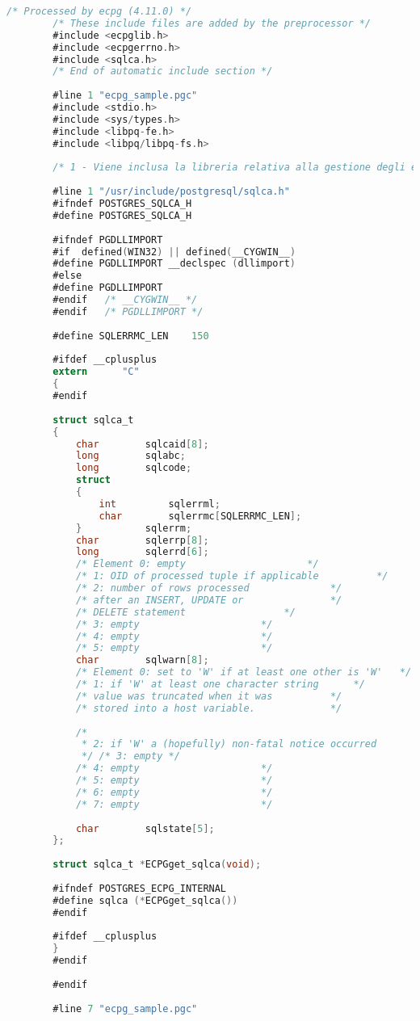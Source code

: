 \documentclass[12pt,a4paper,onecolumn,x11names]{article}
\begin{document}
	\begin{lstlisting}[language=C, caption=testECPG.c]
		/* Processed by ecpg (4.11.0) */
		/* These include files are added by the preprocessor */
		#include <ecpglib.h>
		#include <ecpgerrno.h>
		#include <sqlca.h>
		/* End of automatic include section */
		
		#line 1 "ecpg_sample.pgc"
		#include <stdio.h>
		#include <sys/types.h>
		#include <libpq-fe.h>
		#include <libpq/libpq-fs.h>
		
		/* 1 - Viene inclusa la libreria relativa alla gestione degli errori tramite la variabile globale sqlca (SQL communication area) */
		
		#line 1 "/usr/include/postgresql/sqlca.h"
		#ifndef POSTGRES_SQLCA_H
		#define POSTGRES_SQLCA_H
		
		#ifndef PGDLLIMPORT
		#if  defined(WIN32) || defined(__CYGWIN__)
		#define PGDLLIMPORT __declspec (dllimport)
		#else
		#define PGDLLIMPORT
		#endif   /* __CYGWIN__ */
		#endif   /* PGDLLIMPORT */
		
		#define SQLERRMC_LEN	150
		
		#ifdef __cplusplus
		extern		"C"
		{
		#endif
		
		struct sqlca_t
		{
			char		sqlcaid[8];
			long		sqlabc;
			long		sqlcode;
			struct
			{
				int			sqlerrml;
				char		sqlerrmc[SQLERRMC_LEN];
			}			sqlerrm;
			char		sqlerrp[8];
			long		sqlerrd[6];
			/* Element 0: empty						*/
			/* 1: OID of processed tuple if applicable			*/
			/* 2: number of rows processed				*/
			/* after an INSERT, UPDATE or				*/
			/* DELETE statement					*/
			/* 3: empty						*/
			/* 4: empty						*/
			/* 5: empty						*/
			char		sqlwarn[8];
			/* Element 0: set to 'W' if at least one other is 'W'	*/
			/* 1: if 'W' at least one character string		*/
			/* value was truncated when it was			*/
			/* stored into a host variable.             */
		
			/*
			 * 2: if 'W' a (hopefully) non-fatal notice occurred
			 */	/* 3: empty */
			/* 4: empty						*/
			/* 5: empty						*/
			/* 6: empty						*/
			/* 7: empty						*/
		
			char		sqlstate[5];
		};
		
		struct sqlca_t *ECPGget_sqlca(void);
		
		#ifndef POSTGRES_ECPG_INTERNAL
		#define sqlca (*ECPGget_sqlca())
		#endif
		
		#ifdef __cplusplus
		}
		#endif
		
		#endif
		
		#line 7 "ecpg_sample.pgc"
		

\end{lstlisting}
\end{document}
